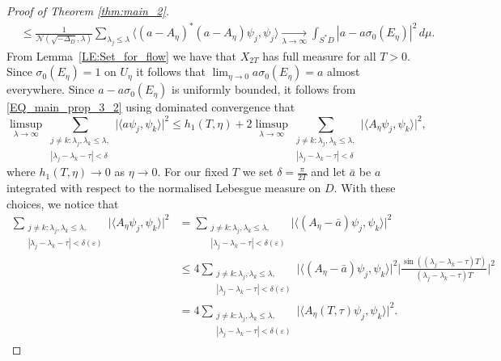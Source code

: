 \documentclass[11pt,twoside,reqno]{amsart}
\newcommand{\1}{\mathrm{\mathbf{1}}}
\numberwithin{equation}{section}
\theoremstyle{plain}
\theoremstyle{definition}
\theoremstyle{remark}
\begin{document}
\begin{proof}[Proof of Theorem \ref{thm:main_2}]
\begin{equation}
\begin{aligned}
    &\leq  \frac{1}{\mathcal{N}(\sqrt{-\Delta_D},\lambda)} \sum_{ \lambda_j \leq \lambda } \langle (a- A_\eta)^{*}(a- A_\eta) \psi_j , \psi_j\rangle
    \underset{\lambda \rightarrow \infty}{\longrightarrow} \int_{S^{*}D} |a-a\sigma_0(E_\eta) |^2 \, d\mu.
    \end{aligned}
\end{equation}
From Lemma~\ref{LE:Set_for_flow} we have that $X_{2T}$ has full measure for all $T>0$. Since $\sigma_0(E_\eta)=1$ on $U_\eta$ it follows that $\lim_{\eta\rightarrow 0} a\sigma_0(E_\eta)=a$ almost everywhere. Since $a-a\sigma_0(E_\eta)$ is uniformly bounded, it follows from \eqref{EQ_main_prop_3_2} using dominated convergence that
\begin{equation}\label{EQ_main_prop_3_3}
    \limsup_{\lambda\rightarrow\infty}  \sum_{\substack{j\neq k: \lambda_j,\lambda_k\leq \lambda,  \\ |\lambda_{j}-\lambda_{k}-\tau| < \delta}} \big| \langle a \psi_j , \psi_k\rangle  \big|^2 
    \leq h_1(T,\eta) + 2 \limsup_{\lambda\rightarrow\infty}\sum_{\substack{j\neq k: \lambda_j,\lambda_k\leq \lambda,  \\ |\lambda_{j}-\lambda_{k}-\tau| < \delta}} \big| \langle A_\eta \psi_j , \psi_k\rangle  \big|^2, 
\end{equation}
where $h_1(T,\eta) \rightarrow 0$ as $\eta\rightarrow0$. 
For our fixed $T$ we set $\delta = \frac{\pi}{2T}$ and let $\bar{a}$ be $a$ integrated with respect to the normalised Lebesgue measure on $D$. With these choices, we notice that
\begin{equation}\label{EQ_main_prop_3_4}
\begin{aligned}
    \sum_{\substack{j\neq k: \lambda_j,\lambda_k\leq \lambda,  \\ |\lambda_{j}-\lambda_{k}-\tau| < \delta(\varepsilon)}} \big| \langle A_\eta \psi_j , \psi_k\rangle  \big|^2 
    & = \sum_{\substack{j\neq k: \lambda_j,\lambda_k\leq \lambda,  \\ |\lambda_{j}-\lambda_{k}-\tau| < \delta(\varepsilon)}} \big| \langle (A_\eta - \bar{a}) \psi_j , \psi_k\rangle  \big|^2 
    \\
    &\leq 4\sum_{\substack{j\neq k: \lambda_j,\lambda_k\leq \lambda,  \\ |\lambda_{j}-\lambda_{k}-\tau| < \delta(\varepsilon)}} \big| \langle (A_\eta - \bar{a}) \psi_j , \psi_k\rangle  \big|^2 \Big|\tfrac{\sin((\lambda_{j}-\lambda_{k}-\tau) T)}{(\lambda_{j}-\lambda_{k}-\tau) T}\Big|^2 
    \\
    &= 4 \sum_{\substack{j\neq k: \lambda_j,\lambda_k\leq \lambda,  \\ |\lambda_{j}-\lambda_{k}-\tau| < \delta(\varepsilon)}} \big| \langle A_\eta(T,\tau) \psi_j , \psi_k\rangle  \big|^2.

\end{aligned}
\end{equation}
\end{proof}
\end{document}
